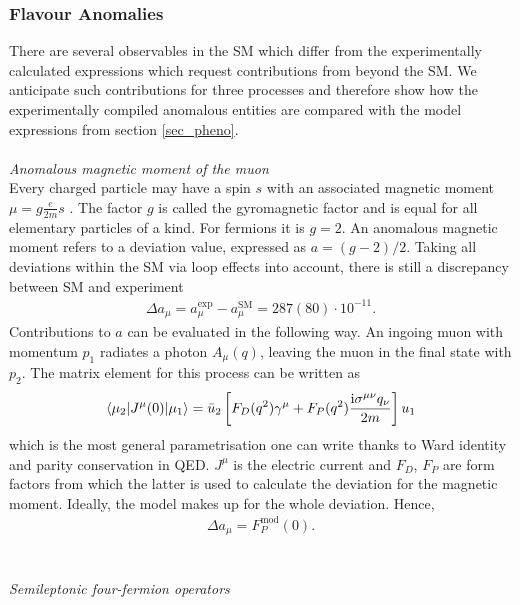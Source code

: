 \subsubsection{Flavour Anomalies}
\label{sec_flAnom}
There are several observables in the SM which differ from the experimentally calculated expressions which request contributions from beyond the 
SM. We anticipate such contributions for three processes and therefore show how the experimentally compiled anomalous entities are compared with
the model expressions from section \ref{sec_pheno}.
\\ \\\textit{Anomalous magnetic moment of the muon}\\
\noindent
Every charged particle
may have a spin $s$ with an associated magnetic moment $ \mu = g \frac{e}{2m}s$ \cite{anomMom}.
The factor $g$ is called the gyromagnetic factor and is equal for all elementary particles of a kind. For fermions it is $g=2$. An anomalous
magnetic moment refers to a deviation value, expressed as $a=(g-2)/2$. Taking all deviations within the SM via loop effects into account, there
is still a discrepancy between SM and experiment 
\begin{align}
 \Delta a_\mu = a_\mu^\text{exp} - a_\mu^\text{SM} = 287(80)\cdot 10^{-11}.
\end{align}
Contributions to $a$ can be evaluated in the following way. An ingoing muon with momentum $p_1$ radiates a photon $A_\mu (q)$, leaving the muon in the final 
state with $p_2$. The matrix element for this process can be written as
\begin{align}
 \langle \mu_2|J^\mu(0)|\mu_1\rangle = \bar u_2 \left[F_D(q^2)\gamma^\mu + F_P(q^2)\frac{\text{i} \sigma^{\mu\nu}q_\nu}{2m}\right] u_1
 \label{eq_gordon}
\end{align}
which is the most general parametrisation one can write thanks to Ward identity and parity conservation in QED. $J^\mu$ is the electric current
and $F_D$, $F_P$ are form factors from which the latter is used to calculate the deviation for the magnetic moment. Ideally, the model makes up
for the whole deviation. Hence,
\begin{align}
 \Delta a_\mu = F_P^\text{mod}(0).
\end{align}
\\ \\ \textit{Semileptonic four-fermion operators}\\

